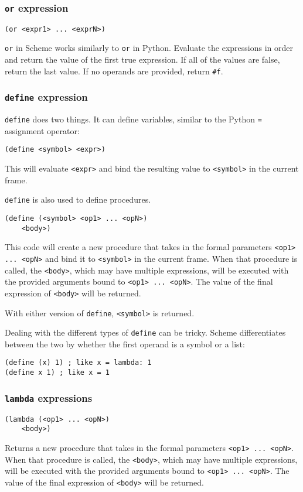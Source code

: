 \subsubsection{\lstinline{or} expression}
\begin{lstlisting}
(or <expr1> ... <exprN>)
\end{lstlisting}
\lstinline{or} in Scheme works similarly to \lstinline{or} in Python. Evaluate the expressions in order and return the value of the first true expression. If all of the values are false, return the last value. If no operands are provided, return \lstinline{#f}.

\subsubsection{\lstinline{define} expression}

\lstinline{define} does two things. It can define variables, similar to the Python \lstinline{=} assignment operator:
\begin{lstlisting}
(define <symbol> <expr>)
\end{lstlisting}
This will evaluate \lstinline{<expr>} and bind the resulting value to \lstinline{<symbol>} in the current frame. 

\lstinline{define} is also used to define procedures. 

\begin{lstlisting}
(define (<symbol> <op1> ... <opN>) 
    <body>)
    \end{lstlisting} 
This code will create a new procedure that takes in the formal parameters \lstinline{<op1> ... <opN>} and bind it to \lstinline{<symbol>} in the current frame. When that procedure is called, the \lstinline{<body>}, which may have multiple expressions, will be executed with the provided arguments bound to \lstinline{<op1> ... <opN>}. The value of the final expression of \lstinline{<body>} will be returned. 

With either version of \lstinline{define}, \lstinline{<symbol>} is returned. 

Dealing with the different types of \lstinline{define} can be tricky. Scheme differentiates between the two by whether the first operand is a symbol or a list:  
\begin{lstlisting}
(define (x) 1) ; like x = lambda: 1
(define x 1) ; like x = 1
\end{lstlisting}

\subsubsection{\lstinline{lambda} expressions}
\begin{lstlisting}
(lambda (<op1> ... <opN>) 
    <body>) 
\end{lstlisting}
Returns a new procedure that takes in the formal parameters \lstinline{<op1> ... <opN>}. When that procedure is called, the \lstinline{<body>}, which may have multiple expressions, will be executed with the provided arguments bound to \lstinline{<op1> ... <opN>}. The value of the final expression of \lstinline{<body>} will be returned. 

